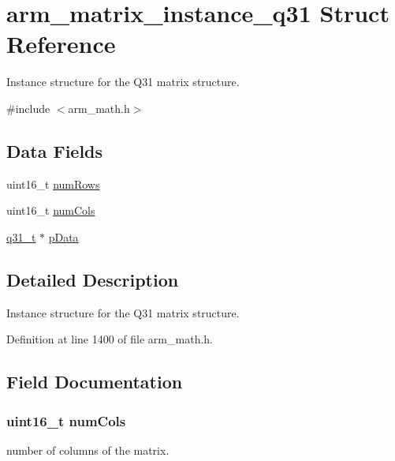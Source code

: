 \hypertarget{structarm__matrix__instance__q31}{}\section{arm\+\_\+matrix\+\_\+instance\+\_\+q31 Struct Reference}
\label{structarm__matrix__instance__q31}


Instance structure for the Q31 matrix structure.  




{\ttfamily \#include $<$arm\+\_\+math.\+h$>$}

\subsection*{Data Fields}
\begin{DoxyCompactItemize}
\item 
uint16\+\_\+t \hyperlink{structarm__matrix__instance__q31_a1bcf80ccdc2acc29198f1592ae300390}{num\+Rows}
\item 
uint16\+\_\+t \hyperlink{structarm__matrix__instance__q31_a4bb5ec0d13eb4c9cf887aa8366a44117}{num\+Cols}
\item 
\hyperlink{arm__math_8h_adc89a3547f5324b7b3b95adec3806bc0}{q31\+\_\+t} $\ast$ \hyperlink{structarm__matrix__instance__q31_ad296f76577326ff280726323536eed6d}{p\+Data}
\end{DoxyCompactItemize}


\subsection{Detailed Description}
Instance structure for the Q31 matrix structure. 

Definition at line 1400 of file arm\+\_\+math.\+h.



\subsection{Field Documentation}
\subsubsection[{\texorpdfstring{num\+Cols}{numCols}}]{\setlength{\rightskip}{0pt plus 5cm}uint16\+\_\+t num\+Cols}\hypertarget{structarm__matrix__instance__q31_a4bb5ec0d13eb4c9cf887aa8366a44117}{}\label{structarm__matrix__instance__q31_a4bb5ec0d13eb4c9cf887aa8366a44117}
number of columns of the matrix. 


